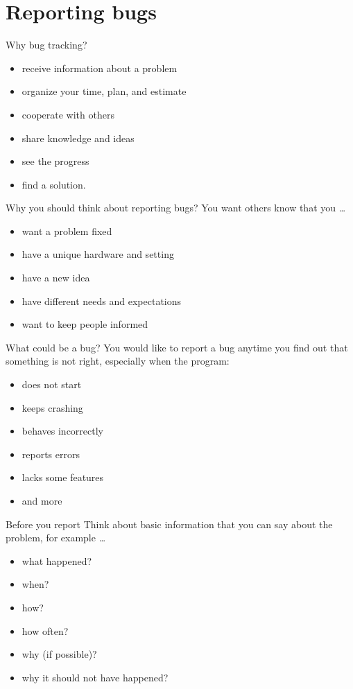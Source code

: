 \documentclass[12pt]{beamer}
\begin{document}
\section{Reporting bugs}
\begin{frame}{Why bug tracking?}

\begin{itemize}
	\item receive information about a problem
	\item organize your time, plan, and estimate
	\item cooperate with others
	\item share knowledge and ideas
	\item see the progress
	\item find a solution.
\end{itemize}
\end{frame}

\begin{frame}{Why you should think about reporting bugs?}
You want others know that you  \ldots{}
\begin{itemize}
	\item want a problem fixed
	\item have a unique hardware and setting
	\item have a new idea
	\item have different needs and expectations
	\item want to keep people informed
\end{itemize}

\end{frame}

\begin{frame}{What could be a bug?}
You would like to report a bug anytime you find out that something is not right, especially when the program:
\begin{itemize}
	\item does not start
	\item keeps crashing
	\item behaves incorrectly
	\item reports errors
	\item lacks some features
	\item and more
\end{itemize}
\end{frame}

\begin{frame}{Before you report}
Think about basic information that you can say about the problem, for example \ldots

\begin{itemize}
	\item what happened?
	\item when? 
	\item how? 
	\item how often?
	\item why (if possible)?
	\item why it should not have happened?
\end{itemize}	
\end{frame}
\end{document}
